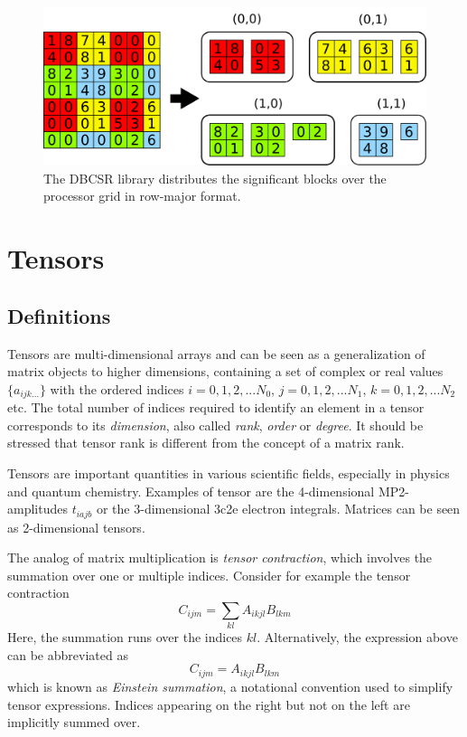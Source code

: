 \begin{figure}
\centering
\includegraphics[scale=0.25]{Pics/DISTSTOR3.pdf}
\caption[Distributed block compressed sparse row format]{The DBCSR library distributes the significant blocks over the processor grid in row-major format.}
\label{fig:DISTSTOR3}
\end{figure}


\section{Tensors}

\subsection{Definitions}

Tensors are multi-dimensional arrays and can be seen as a generalization of matrix objects to higher dimensions, containing a set of complex or real values $\{a_{ijk...}\}$ with the ordered indices $i = 0,1,2,...N_0$, $j = 0,1,2,...N_1$, $k = 0,1,2,...N_2$ etc. The total number of indices required to identify an element in a tensor corresponds to its \emph{dimension}, also called \emph{rank}, \emph{order} or \emph{degree}. It should be stressed that tensor rank is different from the concept of a matrix rank. 

Tensors are important quantities in various scientific fields, especially in physics and quantum chemistry. Examples of tensor are the 4-dimensional MP2-amplitudes $t_{iajb}$ or the 3-dimensional 3c2e electron integrals. Matrices can be seen as 2-dimensional tensors. 

The analog of matrix multiplication is \emph{tensor contraction}, which involves the summation over one or multiple indices. Consider for example the tensor contraction
\begin{equation}
C_{ijm} = \sum_{kl} A_{ikjl} B_{lkm}
\end{equation}
\noindent Here, the summation runs over the indices $kl$. Alternatively, the expression above can be abbreviated as
\begin{equation}
C_{ijm} = A_{ikjl} B_{lkm}
\label{eq:TENEX}
\end{equation}
\noindent which is known as  \emph{Einstein summation}, a notational convention used to simplify tensor expressions. Indices appearing on the right but not on the left are implicitly summed over. 

